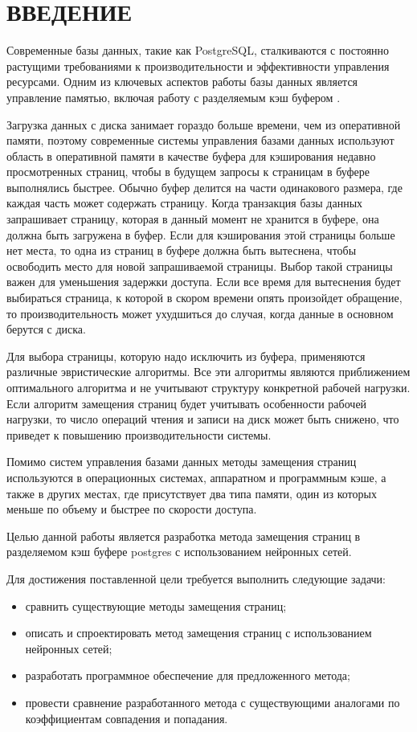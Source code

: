 \chapter*{ВВЕДЕНИЕ}

Современные базы данных, такие как PostgreSQL, сталкиваются с постоянно растущими требованиями к производительности и эффективности управления ресурсами.
Одним из ключевых аспектов работы базы данных является управление памятью, включая работу с разделяемым кэш буфером \cite{yuan2022learned}.

Загрузка данных с диска занимает гораздо больше времени, чем из оперативной памяти, поэтому современные системы управления базами данных используют область в оперативной памяти в качестве буфера для кэширования недавно просмотренных страниц, чтобы в будущем запросы к страницам в буфере выполнялись быстрее. 
Обычно буфер делится на части одинакового размера, где каждая часть может содержать страницу. 
Когда транзакция базы данных запрашивает страницу, которая в данный момент не хранится в буфере, она должна быть загружена в буфер.
Если для кэширования этой страницы больше нет места, то одна из страниц в буфере должна быть вытеснена, чтобы освободить место для новой запрашиваемой страницы. 
Выбор такой страницы важен для уменьшения задержки доступа.
Если все время для вытеснения будет выбираться страница, к которой в скором времени опять произойдет обращение, то производительность может ухудшиться до случая, когда данные в основном берутся с диска.

Для выбора страницы, которую надо исключить из буфера, применяются различные эвристические алгоритмы.
Все эти алгоритмы являются приближением оптимального алгоритма и не учитывают структуру конкретной рабочей нагрузки.
Если алгоритм замещения страниц будет учитывать особенности рабочей нагрузки, то число операций чтения и записи на диск может быть снижено, что приведет к повышению производительности системы.

Помимо систем управления базами данных методы замещения страниц используются в операционных системах, аппаратном и программным кэше, а также в других местах, где присутствует два типа памяти, один из которых меньше по объему и быстрее по скорости доступа.

Целью данной работы является разработка метода замещения страниц в разделяемом кэш буфере postgres с использованием нейронных сетей.

Для достижения поставленной цели требуется выполнить следующие задачи:
\begin{itemize}
	\item сравнить существующие методы замещения страниц;
	\item описать и спроектировать метод замещения страниц с использованием нейронных сетей;
	\item разработать программное обеспечение для предложенного метода;
	\item провести сравнение разработанного метода с существующими аналогами по коэффициентам совпадения и попадания.
\end{itemize}